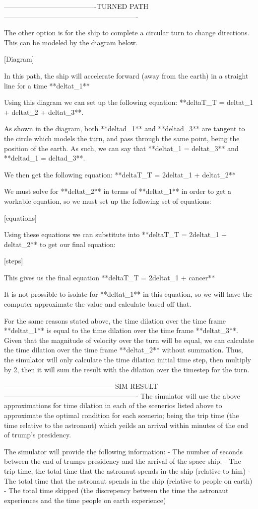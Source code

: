 ----------------------------------------TURNED PATH----------------------------------------------------------

The other option is for the ship to complete a circular turn to change directions. This can be modeled by the 
diagram below.

[Diagram]

In this path, the ship will accelerate forward (away from the earth) in a straight line for a time **deltat_1**

Using this diagram we can set up the following equation: **deltaT_T = deltat_1 + deltat_2 + deltat_3**.

As shown in the diagram, both **deltad_1** and **deltad_3** are tangent to the circle which models the turn, and pass through
the same point, being the position of the earth. As such, we can say that **deltat_1 = deltat_3** and **deltad_1 = deltad_3**.

We then get the following equation: **deltaT_T = 2deltat_1 + deltat_2**

We must solve for **deltat_2** in terms of **deltat_1** in order to get a workable equation, so we must set up the following set of 
equations:

[equations]

Using these equations we can substitute into **deltaT_T = 2deltat_1 + deltat_2** to get our final equation:

[steps]

This gives us the final equation **deltaT_T = 2deltat_1 + cancer**

It is not prossible to isolate for **deltat_1** in this equation, so we will have the computer approximate the value and calculate based
off that.

For the same reasons stated above, the time dilation over the time frame **deltat_1** is equal to the time dilation over the time frame
**deltat_3**. Given that the magnitude of velocity over the turn will be equal, we can calculate the time dilation over the time frame
**deltat_2** without summation. Thus, the simulator will only calculate the time dilation initial time step, then multiply by 2, then 
it will sum the result with the dilation over the timestep for the turn.

------------------------------------------------SIM RESULT----------------------------------------------------------
The simulator will use the above approximations for time dilation in each of the scenerios listed above to approximate the optimal
condition for each scenerio; being the trip time (the time relative to the astronaut) which yeilds an arrival within minutes of the
end of trump's presidency.

The simulator will provide the following information:
- The number of seconds between the end of trumps presidency and the arrival of the space ship.
- The trip time, the total time that the astronaut spends in the ship (relative to him)
- The total time that the astronaut spends in the ship (relative to people on earth)
- The total time skipped (the discrepency between the time the astronaut experiences and the time people on earth experience)
